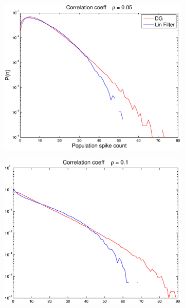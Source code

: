 \documentclass[11pt]{article}
\begin{document}
\begin{figure}[H]
	\centering
	\begin{subfigure}[h]{0.49\textwidth}
	\centering
	\includegraphics[width=\textwidth]{../Figures/Lin_Filter/Filt_DG_indiv_mu_01_rho_05}
	\label{fig11}
	\end{subfigure}
	\begin{subfigure}[h]{0.49\textwidth}
	\centering
	\includegraphics[width=\textwidth]{../Figures/Lin_Filter/Filt_DG_indiv_mu_01_rho_1}
	\label{fig11}
	\end{subfigure}\\

\end{figure}
\end{document}
